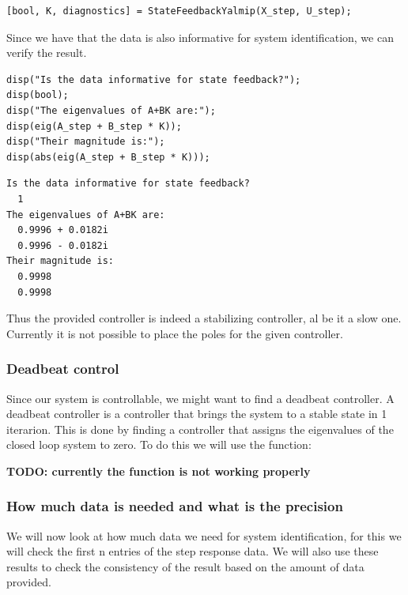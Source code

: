 \begin{lstlisting}
[bool, K, diagnostics] = StateFeedbackYalmip(X_step, U_step);
\end{lstlisting}

Since we have that the data is also informative for system identification, we can verify the result.

\begin{lstlisting}
disp("Is the data informative for state feedback?");
disp(bool);
disp("The eigenvalues of A+BK are:");
disp(eig(A_step + B_step * K));
disp("Their magnitude is:");
disp(abs(eig(A_step + B_step * K)));
\end{lstlisting}

\begin{verbatim}
Is the data informative for state feedback?
  1
The eigenvalues of A+BK are:
  0.9996 + 0.0182i
  0.9996 - 0.0182i
Their magnitude is:
  0.9998
  0.9998
\end{verbatim}

Thus the provided controller is indeed a stabilizing controller, al be it a slow one. Currently it is not possible to place the poles for the given controller.

\subsubsection{Deadbeat control}
Since our system is controllable, we might want to find a deadbeat controller. A deadbeat controller is a controller that brings the system to a stable state in 1 iterarion. This is done by finding a controller that assigns the eigenvalues of the closed loop system to zero. To do this we will use the function:
\begin{center}
\end{center}

\textbf{TODO: currently the  function is not working properly}



\subsubsection{How much data is needed and what is the precision}
We will now look at how much data we need for system identification, for this we will check the first n entries of the step response data. We will also use these results to check the consistency of the result based on the amount of data provided.

